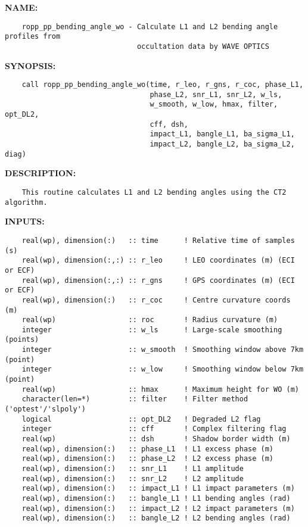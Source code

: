 \label{ch:robo103}
\label{ch:WaveOptics_ropp_pp_bending_angle_wo}
\textbf{NAME:}\hspace{0.08in}\begin{Verbatim}
    ropp_pp_bending_angle_wo - Calculate L1 and L2 bending angle profiles from
                               occultation data by WAVE OPTICS
\end{Verbatim}
\textbf{SYNOPSIS:}\hspace{0.08in}\begin{Verbatim}
    call ropp_pp_bending_angle_wo(time, r_leo, r_gns, r_coc, phase_L1,
                                  phase_L2, snr_L1, snr_L2, w_ls,
                                  w_smooth, w_low, hmax, filter, opt_DL2,
                                  cff, dsh, 
                                  impact_L1, bangle_L1, ba_sigma_L1,
                                  impact_L2, bangle_L2, ba_sigma_L2, diag)
\end{Verbatim}
\textbf{DESCRIPTION:}\hspace{0.08in}\begin{Verbatim}
    This routine calculates L1 and L2 bending angles using the CT2 algorithm.
\end{Verbatim}
\textbf{INPUTS:}\hspace{0.08in}\begin{Verbatim}
    real(wp), dimension(:)   :: time      ! Relative time of samples (s)
    real(wp), dimension(:,:) :: r_leo     ! LEO coordinates (m) (ECI or ECF)
    real(wp), dimension(:,:) :: r_gns     ! GPS coordinates (m) (ECI or ECF)
    real(wp), dimension(:)   :: r_coc     ! Centre curvature coords (m)
    real(wp)                 :: roc       ! Radius curvature (m)
    integer                  :: w_ls      ! Large-scale smoothing (points)
    integer                  :: w_smooth  ! Smoothing window above 7km (point)
    integer                  :: w_low     ! Smoothing window below 7km (point)
    real(wp)                 :: hmax      ! Maximum height for WO (m)
    character(len=*)         :: filter    ! Filter method ('optest'/'slpoly')
    logical                  :: opt_DL2   ! Degraded L2 flag
    integer                  :: cff       ! Complex filtering flag
    real(wp)                 :: dsh       ! Shadow border width (m)
    real(wp), dimension(:)   :: phase_L1  ! L1 excess phase (m)
    real(wp), dimension(:)   :: phase_L2  ! L2 excess phase (m)
    real(wp), dimension(:)   :: snr_L1    ! L1 amplitude
    real(wp), dimension(:)   :: snr_L2    ! L2 amplitude
    real(wp), dimension(:)   :: impact_L1 ! L1 impact parameters (m)
    real(wp), dimension(:)   :: bangle_L1 ! L1 bending angles (rad)
    real(wp), dimension(:)   :: impact_L2 ! L2 impact parameters (m)
    real(wp), dimension(:)   :: bangle_L2 ! L2 bending angles (rad)
\end{Verbatim}
